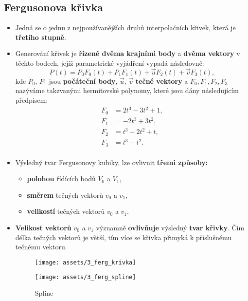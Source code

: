 \subsection{Fergusonova křivka}
\begin{itemize}
    \item Jedná se o jednu z nejpoužívanějších druhů interpolačních křivek, která je \textbf{třetího stupně}.
    \item Generování křivek je \textbf{řízené dvěma krajními body} a \textbf{dvěma vektory} v těchto bodech, jejíž parametrické vyjádření vypadá následovně:
          \begin{equation*}
              P(t) = P_0F_0(t) + P_1F_1(t) + \vec{u}F_2(t) + \vec{v}F_3(t),
          \end{equation*}
          kde $P_0$, $P_1$ jsou \textbf{počáteční body}, $\vec{u}$, $\vec{v}$ \textbf{tečné vektory} a $F_0, F_1, F_2, F_3$ nazýváme takzvanými hermitovské polynomy, které jsou dány následujícím předpisem:
          \begin{equation*}
              \begin{split}
                  F_0 &= 2t^3 - 3t^2 + 1,\\
                  F_1 &= -2t^3 + 3t^2,\\
                  F_2 &= t^3 - 2t^2 + t,\\
                  F_3 &= t^3 - t^2.\\
              \end{split}
          \end{equation*}

    \item \noindent Výsledný tvar Fergusonovy kubiky, lze ovlivnit \textbf{třemi způsoby:}
          \begin{itemize}
              \item \textbf{polohou} řídících bodů $V_0$ a $V_1$,
              \item \textbf{směrem} tečných vektorů $v_0$ a $v_1$,
              \item \textbf{velikostí} tečných vektorů $v_0$ a $v_1$.
          \end{itemize}
    \item \textbf{Velikost vektorů} $v_0$ a $v_1$ významně \textbf{ovlivňuje} výsledný \textbf{tvar křivky}. Čím délka tečných vektorů je větší, tím více se křivka přimyká k příslušnému tečnému vektoru.
          \begin{figure}[H]
              \centering
              \texttt{[image: assets/3\_ferg\_krivka]}
          \end{figure}
          \begin{figure}[H]
              \centering
              \texttt{[image: assets/3\_ferg\_spline]}
              \caption{Spline}
          \end{figure}
\end{itemize}


